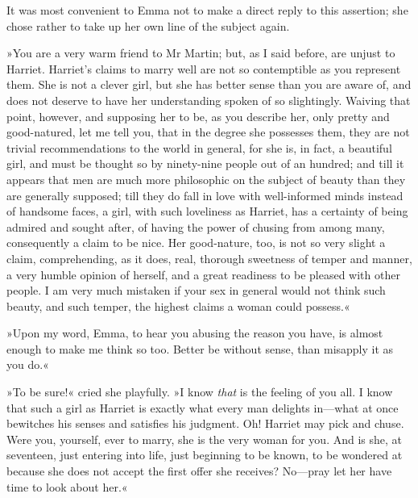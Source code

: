 It was most convenient to Emma not to make a direct reply to this assertion; she chose rather to take up her own line of the subject again.

»You are a very warm friend to Mr Martin; but, as I said before, are unjust to Harriet. Harriet's claims to marry well are not so contemptible as you represent them. She is not a clever girl, but she has better sense than you are aware of, and does not deserve to have her understanding spoken of so slightingly. Waiving that point, however, and supposing her to be, as you describe her, only pretty and good-natured, let me tell you, that in the degree she possesses them, they are not trivial recommendations to the world in general, for she is, in fact, a beautiful girl, and must be thought so by ninety-nine people out of an hundred; and till it appears that men are much more philosophic on the subject of beauty than they are generally supposed; till they do fall in love with well-informed minds instead of handsome faces, a girl, with such loveliness as Harriet, has a certainty of being admired and sought after, of having the power of chusing from among many, consequently a claim to be nice. Her good-nature, too, is not so very slight a claim, comprehending, as it does, real, thorough sweetness of temper and manner, a very humble opinion of herself, and a great readiness to be pleased with other people. I am very much mistaken if your sex in general would not think such beauty, and such temper, the highest claims a woman could possess.«

»Upon my word, Emma, to hear you abusing the reason you have, is almost enough to make me think so too. Better be without sense, than misapply it as you do.«

»To be sure!« cried she playfully. »I know \textit{that} is the feeling of you all. I know that such a girl as Harriet is exactly what every man delights in—what at once bewitches his senses and satisfies his judgment. Oh! Harriet may pick and chuse. Were you, yourself, ever to marry, she is the very woman for you. And is she, at seventeen, just entering into life, just beginning to be known, to be wondered at because she does not accept the first offer she receives? No—pray let her have time to look about her.«

